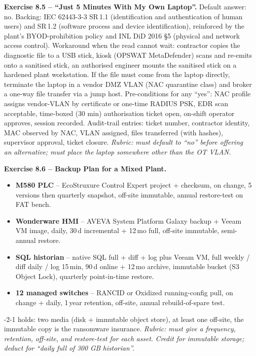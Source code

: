 \documentclass[11pt,a4paper]{article}
\begin{document}
\begin{solutionbox}
\textbf{Exercise 8.5 -- ``Just 5 Minutes With My Own Laptop''.}
Default answer: no. Backing: IEC 62443-3-3 SR\,1.1 (identification and authentication of human users) and SR\,1.2 (software process and device identification), reinforced by the plant's BYOD-prohibition policy and INL DiD 2016 \S 5 (physical and network access control). Workaround when the read cannot wait: contractor copies the diagnostic file to a USB stick, kiosk (OPSWAT MetaDefender) scans and re-emits onto a sanitised stick, an authorised engineer mounts the sanitised stick on a hardened plant workstation. If the file must come from the laptop directly, terminate the laptop in a vendor DMZ VLAN (NAC quarantine class) and broker a one-way file transfer via a jump host. Pre-conditions for any ``yes'': NAC profile assigns vendor-VLAN by certificate or one-time RADIUS PSK, EDR scan acceptable, time-boxed (30 min) authorisation ticket open, on-shift operator approves, session recorded. Audit-trail entries: ticket number, contractor identity, MAC observed by NAC, VLAN assigned, files transferred (with hashes), supervisor approval, ticket closure.
\textit{Rubric: must default to ``no'' before offering an alternative; must place the laptop somewhere other than the OT VLAN.}
\end{solutionbox}

\begin{solutionbox}
\textbf{Exercise 8.6 -- Backup Plan for a Mixed Plant.}
\begin{itemize}\setlength{\itemsep}{1pt}\small
  \item \textbf{M580 PLC} -- EcoStruxure Control Expert project + checksum, on change, 5 versions then quarterly snapshot, off-site immutable, annual restore-test on FAT bench.
  \item \textbf{Wonderware HMI} -- AVEVA System Platform Galaxy backup + Veeam VM image, daily, 30\,d incremental + 12\,mo full, off-site immutable, semi-annual restore.
  \item \textbf{SQL historian} -- native SQL full + diff + log plus Veeam VM, full weekly / diff daily / log 15\,min, 90\,d online + 12\,mo archive, immutable bucket (S3 Object Lock), quarterly point-in-time restore.
  \item \textbf{12 managed switches} -- RANCID or Oxidized running-config pull, on change + daily, 1\,year retention, off-site, annual rebuild-of-spare test.
\end{itemize}
-2-1 holds: two media (disk + immutable object store), at least one off-site, the immutable copy is the ransomware insurance.
\textit{Rubric: must give a frequency, retention, off-site, and restore-test for each asset. Credit for immutable storage; deduct for ``daily full of 300 GB historian''.}
\end{solutionbox}
\end{document}
